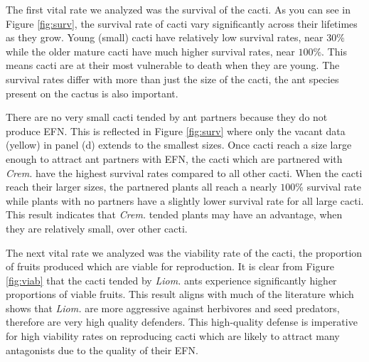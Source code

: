 \documentclass[12pt,a4paper]{article}
\begin{document}
	The first vital rate we analyzed was the survival of the cacti. As you can see in Figure \ref{fig:surv}, the survival rate of cacti vary significantly across their lifetimes as they grow. Young (small) cacti have relatively low survival rates, near $30\%$ while the older mature cacti have much higher survival rates, near $100\%$. This means cacti are at their most vulnerable to death when they are young. The survival rates differ with more than just the size of the cacti, the ant species present on the cactus is also important. 

There are no very small cacti tended by ant partners because they do not produce EFN. This is reflected in Figure \ref{fig:surv} where only the vacant data (yellow) in panel (d) extends to the smallest sizes. Once cacti reach a size large enough to attract ant partners with EFN, the cacti which are partnered with \textit{Crem.} have the highest survival rates compared to all other cacti. When the cacti reach their larger sizes, the partnered plants all reach a nearly $100\%$ survival rate while plants with no partners have a slightly lower survival rate for all large cacti. This result indicates that \textit{Crem.} tended plants may have an advantage, when they are relatively small, over other cacti. 

The next vital rate we analyzed was the viability rate of the cacti, the proportion of fruits produced which are viable for reproduction. It is clear from Figure \ref{fig:viab} that the cacti tended by \textit{Liom.} ants experience significantly higher proportions of viable fruits. This result aligns with much of the literature which shows that \textit{Liom.} are more aggressive against herbivores and seed predators, therefore are very high quality defenders. This high-quality defense is imperative for high viability rates on reproducing cacti which are likely to attract many antagonists due to the quality of their EFN. 
\end{document}
